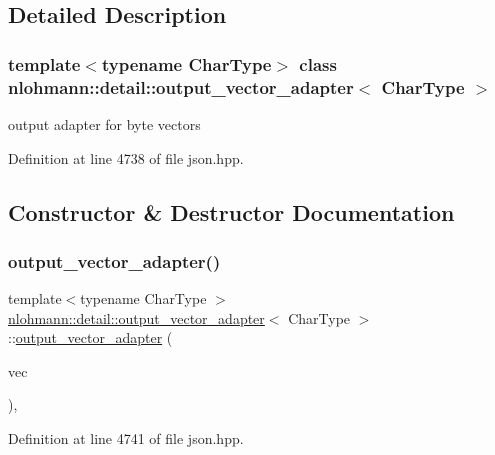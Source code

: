 \subsection{Detailed Description}
\subsubsection*{template$<$typename Char\+Type$>$\newline
class nlohmann\+::detail\+::output\+\_\+vector\+\_\+adapter$<$ Char\+Type $>$}

output adapter for byte vectors 

Definition at line 4738 of file json.\+hpp.



\subsection{Constructor \& Destructor Documentation}
\mbox{\label{classnlohmann_1_1detail_1_1output__vector__adapter_abc6695e8c0274afad31bd581c8acf24f}} 
\subsubsection{\texorpdfstring{output\+\_\+vector\+\_\+adapter()}{output\_vector\_adapter()}}
{\footnotesize\ttfamily template$<$typename Char\+Type $>$ \\
\hyperlink{classnlohmann_1_1detail_1_1output__vector__adapter}{nlohmann\+::detail\+::output\+\_\+vector\+\_\+adapter}$<$ Char\+Type $>$\+::\hyperlink{classnlohmann_1_1detail_1_1output__vector__adapter}{output\+\_\+vector\+\_\+adapter} (\begin{DoxyParamCaption}\item[{std\+::vector$<$ Char\+Type $>$ \&}]{vec }\end{DoxyParamCaption})\hspace{0.3cm}{\ttfamily [inline]}, {\ttfamily [explicit]}}



Definition at line 4741 of file json.\+hpp.


